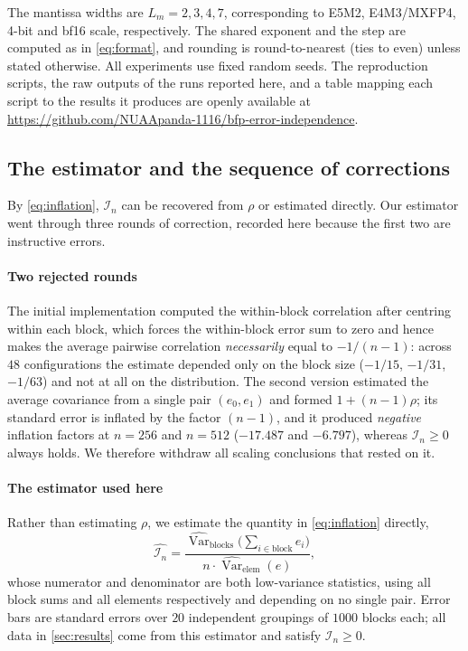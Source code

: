 \documentclass[twocolumn,review,hidelinks,oneeqnum,onetabnum,onefignum,onethmnum]{siamart251216}
\begin{document}
The mantissa widths are $L_m=2,3,4,7$, corresponding to E5M2, E4M3/MXFP4,
4-bit and bf16 scale, respectively. The shared exponent and the step are
computed as in \cref{eq:format}, and rounding is round-to-nearest (ties to even)
unless stated otherwise. All experiments use fixed random seeds. The
reproduction scripts, the raw outputs of the runs reported here, and a table
mapping each script to the results it produces are openly available at
\url{https://github.com/NUAApanda-1116/bfp-error-independence}.

\subsection{The estimator and the sequence of corrections}
\label{sec:estimator}

By \cref{eq:inflation}, $\mathcal I_n$ can be recovered from $\rho$ or estimated
directly. Our estimator went through three rounds of correction, recorded here
because the first two are instructive errors.

\paragraph{Two rejected rounds} The initial implementation computed the within-block
correlation after centring within each block, which forces the within-block error
sum to zero and hence makes the average pairwise correlation \emph{necessarily}
equal to $-1/(n-1)$: across $48$ configurations the estimate depended only on the
block size ($-1/15$, $-1/31$, $-1/63$) and not at all on the distribution. The
second version estimated the average covariance from a single pair $(e_0,e_1)$ and
formed $1+(n-1)\rho$; its standard error is inflated by the factor $(n-1)$, and it
produced \emph{negative} inflation factors at $n=256$ and $n=512$ ($-17.487$ and
$-6.797$), whereas $\mathcal I_n\ge0$ always holds. We therefore withdraw all
scaling conclusions that rested on it.

\paragraph{The estimator used here} Rather than estimating $\rho$, we estimate the
quantity in \cref{eq:inflation} directly,
\begin{equation}
\widehat{\mathcal I_n}
=\frac{\widehat{\operatorname{Var}}_{\text{blocks}}\bigl(\sum_{i\in\text{block}}e_i\bigr)}
{n\cdot\widehat{\operatorname{Var}}_{\text{elem}}(e)} ,
\label{eq:estimator}
\end{equation}
whose numerator and denominator are both low-variance statistics, using all block
sums and all elements respectively and depending on no single pair. Error bars are
standard errors over $20$ independent groupings of $1000$ blocks each; all data in
\cref{sec:results} come from this estimator and satisfy $\mathcal I_n\ge0$.
\end{document}
